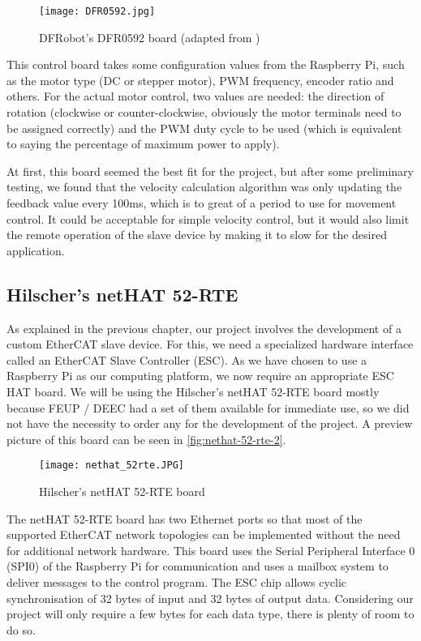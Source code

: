 \begin{figure}[htp]
	\centering
	\texttt{[image: DFR0592.jpg]}
	\caption{DFRobot's DFR0592 board (adapted from \cite{hdw:dfr0592})}
	\label{fig:dfr0592-2}
\end{figure}

This control board takes some configuration values from the Raspberry Pi, such as the motor type (DC or stepper motor), PWM frequency, encoder ratio and others.
For the actual motor control, two values are needed: the direction of rotation (clockwise or counter-clockwise, obviously the motor terminals need to be assigned correctly) and the PWM duty cycle to be used (which is equivalent to saying the percentage of maximum power to apply).

At first, this board seemed the best fit for the project, but after some preliminary testing, we found that the velocity calculation algorithm was only updating the feedback value every 100ms, which is to great of a period to use for movement control.
It could be acceptable for simple velocity control, but it would also limit the remote operation of the slave device by making it to slow for the desired application.

\subsection{Hilscher's netHAT 52-RTE}
As explained in the previous chapter, our project involves the development of a custom EtherCAT slave device.
For this, we need a specialized hardware interface called an EtherCAT Slave Controller (ESC).
As we have chosen to use a Raspberry Pi as our computing platform, we now require an appropriate ESC HAT board.
We will be using the Hilscher's netHAT 52-RTE \cite{hdw:nethat-52rte} board mostly because FEUP / DEEC had a set of them available for immediate use, so we did not have the necessity to order any for the development of the project.
A preview picture of this board can be seen in \autoref{fig:nethat-52-rte-2}.

\begin{figure}[htp]
	\centering
	\texttt{[image: nethat\_52rte.JPG]}
	\caption{Hilscher's netHAT 52-RTE board}
	\label{fig:nethat-52-rte-2}
\end{figure}

The netHAT 52-RTE board has two Ethernet ports so that most of the supported EtherCAT network topologies can be implemented without the need for additional network hardware.
This board uses the Serial Peripheral Interface 0 (SPI0) of the Raspberry Pi for communication and uses a mailbox system to deliver messages to the control program.
The ESC chip allows cyclic synchronisation of 32 bytes of input and 32 bytes of output data.
Considering our project will only require a few bytes for each data type, there is plenty of room to do so.

